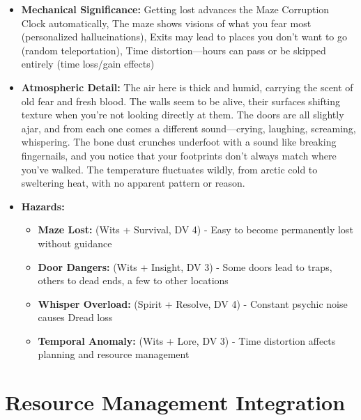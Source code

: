 \documentclass[11pt]{article}
\begin{document}
\begin{enumerate}
\begin{itemize}
  \item \textbf{Mechanical Significance:} Getting lost advances the Maze Corruption Clock automatically, The maze shows visions of what you fear most (personalized hallucinations), Exits may lead to places you don't want to go (random teleportation), Time distortion—hours can pass or be skipped entirely (time loss/gain effects)
  \item \textbf{Atmospheric Detail:} The air here is thick and humid, carrying the scent of old fear and fresh blood. The walls seem to be alive, their surfaces shifting texture when you're not looking directly at them. The doors are all slightly ajar, and from each one comes a different sound—crying, laughing, screaming, whispering. The bone dust crunches underfoot with a sound like breaking fingernails, and you notice that your footprints don't always match where you've walked. The temperature fluctuates wildly, from arctic cold to sweltering heat, with no apparent pattern or reason.
  \item \textbf{Hazards:}
    \begin{itemize}
    \item \textbf{Maze Lost:} (Wits + Survival, DV 4) - Easy to become permanently lost without guidance
    \item \textbf{Door Dangers:} (Wits + Insight, DV 3) - Some doors lead to traps, others to dead ends, a few to other locations
    \item \textbf{Whisper Overload:} (Spirit + Resolve, DV 4) - Constant psychic noise causes Dread loss
    \item \textbf{Temporal Anomaly:} (Wits + Lore, DV 3) - Time distortion affects planning and resource management
    \end{itemize}
  \end{itemize}
\end{enumerate}

\section{Resource Management Integration}
\end{document}
